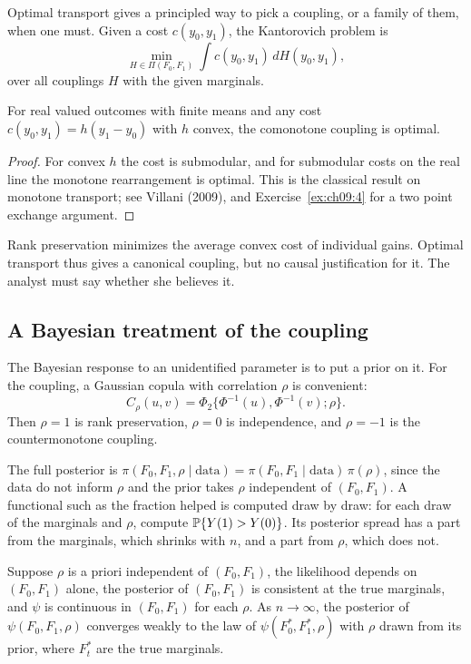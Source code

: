 Optimal transport gives a principled way to pick a coupling, or a family of them, when one must. Given a cost $c(y_0, y_1)$, the Kantorovich problem is
\[
\min_{H \in \Pi(F_0, F_1)} \int c(y_0, y_1)\,dH(y_0, y_1),
\]
over all couplings $H$ with the given marginals.

\begin{proposition}
For real valued outcomes with finite means and any cost $c(y_0, y_1) = h(y_1 - y_0)$ with $h$ convex, the comonotone coupling is optimal.
\end{proposition}

\begin{proof}
For convex $h$ the cost is submodular, and for submodular costs on the real line the monotone rearrangement is optimal. This is the classical result on monotone transport; see Villani (2009), and Exercise~\ref{ex:ch09:4} for a two point exchange argument.
\end{proof}

Rank preservation minimizes the average convex cost of individual gains. Optimal transport thus gives a canonical coupling, but no causal justification for it. The analyst must say whether she believes it.



\subsection{A Bayesian treatment of the coupling}

The Bayesian response to an unidentified parameter is to put a prior on it. For the coupling, a Gaussian copula with correlation $\rho$ is convenient:
\[
C_\rho(u, v) = \Phi_2\{\Phi^{-1}(u), \Phi^{-1}(v); \rho\}.
\]
Then $\rho = 1$ is rank preservation, $\rho = 0$ is independence, and $\rho = -1$ is the countermonotone coupling.

The full posterior is $\pi(F_0, F_1, \rho \mid \text{data}) = \pi(F_0, F_1 \mid \text{data})\,\pi(\rho)$, since the data do not inform $\rho$ and the prior takes $\rho$ independent of $(F_0, F_1)$. A functional such as the fraction helped is computed draw by draw: for each draw of the marginals and $\rho$, compute $\mathbb{P}\{Y(1) > Y(0)\}$. Its posterior spread has a part from the marginals, which shrinks with $n$, and a part from $\rho$, which does not.

\begin{proposition}
Suppose $\rho$ is a priori independent of $(F_0, F_1)$, the likelihood depends on $(F_0, F_1)$ alone, the posterior of $(F_0, F_1)$ is consistent at the true marginals, and $\psi$ is continuous in $(F_0, F_1)$ for each $\rho$. As $n \to \infty$, the posterior of $\psi(F_0, F_1, \rho)$ converges weakly to the law of $\psi(F_0^*, F_1^*, \rho)$ with $\rho$ drawn from its prior, where $F_t^*$ are the true marginals.
\end{proposition}

